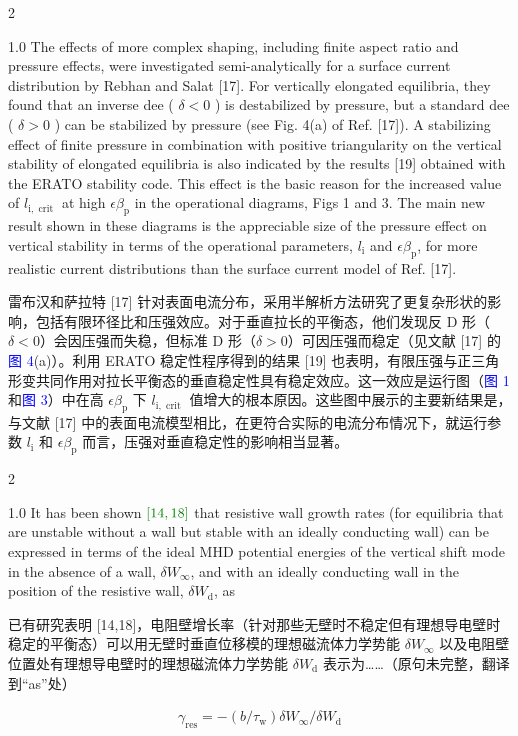 \documentclass[utf8]{ctexart}
\newcommand\enzhbox[2]{
  	\quad\par \begin{paracol}{2} \colseprulecolor{black} 
  		\begin{spacing}{1.0}
  			\footnotesize  #1
  		\end{spacing}
  		\switchcolumn[1] 
  		#2
  	\end{paracol} \quad\par
  }
\begin{document}
\begin{sloppypar}
\enzhbox{  The effects of more complex shaping, including finite aspect ratio and pressure effects, were investigated semi-analytically for a surface current distribution by Rebhan and Salat \textcolor{green!50!black}{[17]}. For vertically elongated equilibria, they found that an inverse dee ( $\delta<0$ ) is destabilized by pressure, but a standard dee ( $\delta>0$ ) can be stabilized by pressure (see Fig. 4(a) of Ref. \textcolor{green!50!black}{[17]}). A stabilizing effect of finite pressure in combination with positive triangularity on the vertical stability of elongated equilibria is also indicated by the results \textcolor{green!50!black}{[19]} obtained with the ERATO stability code. This effect is the basic reason for the increased value of $l_{\mathrm{i}, \text { crit }}$ at high $\epsilon \beta_{\mathrm{p}}$ in the operational diagrams, Figs 1 and 3. The main new result shown in these diagrams is the appreciable size of the pressure effect on vertical stability in terms of the operational parameters, $l_{\mathrm{i}}$ and $\epsilon \beta_{\mathrm{p}}$, for more realistic current distributions than the surface current model of Ref. \textcolor{green!50!black}{[17]}.}{
雷布汉和萨拉特 \textcolor{green!50!black}{[17]} 针对表面电流分布，采用半解析方法研究了更复杂形状的影响，包括有限环径比和压强效应。对于垂直拉长的平衡态，他们发现反 D 形（$\delta < 0$）会因压强而失稳，但标准 D 形（$\delta > 0$）可因压强而稳定（见文献 \textcolor{green!50!black}{[17]} 的\textcolor{blue}{图 4}(a)）。利用 ERATO 稳定性程序得到的结果 \textcolor{green!50!black}{[19]} 也表明，有限压强与正三角形变共同作用对拉长平衡态的垂直稳定性具有稳定效应。这一效应是运行图（\textcolor{blue}{图 1} 和\textcolor{blue}{图 3}）中在高 $\epsilon \beta_{\mathrm{p}}$ 下 $l_{\mathrm{i}, \text { crit }}$ 值增大的根本原因。这些图中展示的主要新结果是，与文献 \textcolor{green!50!black}{[17]} 中的表面电流模型相比，在更符合实际的电流分布情况下，就运行参数 $l_{\mathrm{i}}$ 和 $\epsilon \beta_{\mathrm{p}}$ 而言，压强对垂直稳定性的影响相当显著。 }
  
 
\enzhbox{  It has been shown $\textcolor{green!50!black}{[14,18]}$ that resistive wall growth rates (for equilibria that are unstable without a wall but stable with an ideally conducting wall) can be expressed in terms of the ideal MHD potential energies of the vertical shift mode in the absence of a wall, $\delta W_{\infty}$, and with an ideally conducting wall in the position of the resistive wall, $\delta W_{\mathrm{d}}$, as}{
已有研究表明 \textcolor{green!50!black}{[14,18]}，电阻壁增长率（针对那些无壁时不稳定但有理想导电壁时稳定的平衡态）可以用无壁时垂直位移模的理想磁流体力学势能 $\delta W_{\infty}$ 以及电阻壁位置处有理想导电壁时的理想磁流体力学势能 $\delta W_{\mathrm{d}}$ 表示为……（原句未完整，翻译到“as”处） }
 \begin{align*}
 	 \gamma_{\mathrm{res}}=-\left(b / \tau_{\mathrm{w}}\right) \delta W_{\infty} / \delta W_{\mathrm{d}}
 \end{align*}
 

\end{sloppypar}
\end{document}
